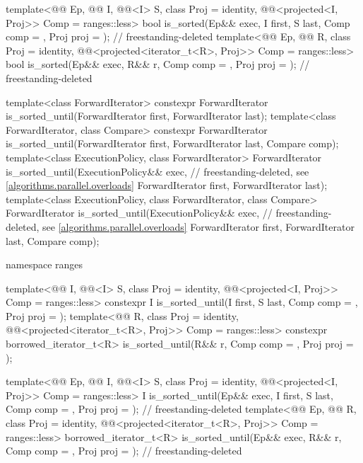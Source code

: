 \begin{codeblock}
{{    template<@@ Ep, @@ I, @@<I> S,
             class Proj = identity,
             @@<projected<I, Proj>> Comp = ranges::less>
      bool is_sorted(Ep&& exec, I first, S last, Comp comp = {},
                     Proj proj = {});                                       // freestanding-deleted
    template<@@ Ep, @@ R, class Proj = identity,
             @@<projected<iterator_t<R>, Proj>> Comp = ranges::less>
      bool is_sorted(Ep&& exec, R&& r, Comp comp = {}, Proj proj = {});     // freestanding-deleted
  }

  template<class ForwardIterator>
    constexpr ForwardIterator
      is_sorted_until(ForwardIterator first, ForwardIterator last);
  template<class ForwardIterator, class Compare>
    constexpr ForwardIterator
      is_sorted_until(ForwardIterator first, ForwardIterator last,
                      Compare comp);
  template<class ExecutionPolicy, class ForwardIterator>
    ForwardIterator
      is_sorted_until(ExecutionPolicy&& exec,                   // freestanding-deleted, see \ref{algorithms.parallel.overloads}
                      ForwardIterator first, ForwardIterator last);
  template<class ExecutionPolicy, class ForwardIterator, class Compare>
    ForwardIterator
      is_sorted_until(ExecutionPolicy&& exec,                   // freestanding-deleted, see \ref{algorithms.parallel.overloads}
                      ForwardIterator first, ForwardIterator last,
                      Compare comp);

  namespace ranges {
    template<@@ I, @@<I> S, class Proj = identity,
             @@<projected<I, Proj>> Comp = ranges::less>
      constexpr I is_sorted_until(I first, S last, Comp comp = {}, Proj proj = {});
    template<@@ R, class Proj = identity,
             @@<projected<iterator_t<R>, Proj>> Comp = ranges::less>
      constexpr borrowed_iterator_t<R>
        is_sorted_until(R&& r, Comp comp = {}, Proj proj = {});

    template<@@ Ep, @@ I, @@<I> S,
             class Proj = identity,
             @@<projected<I, Proj>> Comp = ranges::less>
      I is_sorted_until(Ep&& exec, I first, S last, Comp comp = {},
                        Proj proj = {});                                    // freestanding-deleted
    template<@@ Ep, @@ R, class Proj = identity,
             @@<projected<iterator_t<R>, Proj>> Comp = ranges::less>
      borrowed_iterator_t<R>
        is_sorted_until(Ep&& exec, R&& r, Comp comp = {}, Proj proj = {});  // freestanding-deleted
  }

}
\end{codeblock}
